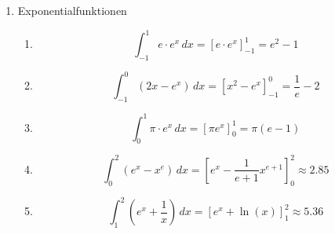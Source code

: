 \begin{enumerate}
	\item Exponentialfunktionen
	      \begin{enumerate}
		      \item
		            \[
			            \int_{-1}^ 1 e\cdot e^{x}\,dx
			            = \left[ e \cdot e^{x}\right]_{-1}^1
			            = e^2-1
		            \]
		      \item
		            \[
			            \int_{-1}^0 (2x-e^x)\,dx
			            = \left[x^2-e^x\right]_{-1}^0
			            = \frac{1}{e}-2
		            \]
		      \item
		            \[
			            \int_0^1 \pi\cdot e^x\,dx
			            = \left[\pi e^x\right]_0^1
			            = \pi(e-1)
		            \]
		      \item
		            \[
			            \int_0^2 (e^x-x^e)\,dx
			            = \left[e^x-\frac{1}{e+1}x^{e+1}\right]_0^2
			            \approx 2.85
		            \]
		      \item
		            \[
			            \int_1^2 \left(e^x+\frac{1}{x}\right)\,dx
			            = \left[e^x+\ln(x)\right]_1^2
			            \approx 5.36
		            \]
	      \end{enumerate}


\end{enumerate}
